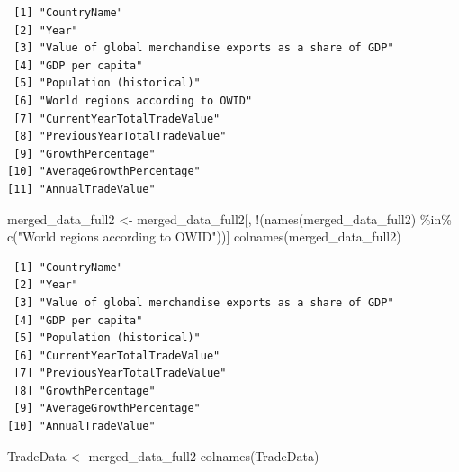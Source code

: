 \documentclass[
  10pt,
]{article}
\newenvironment{Shaded}{\begin{snugshade}}{\end{snugshade}}
\newcommand{\FunctionTok}[1]{\textcolor[rgb]{0.28,0.35,0.67}{#1}}
\newcommand{\NormalTok}[1]{\textcolor[rgb]{0.00,0.23,0.31}{#1}}
\newcommand{\OtherTok}[1]{\textcolor[rgb]{0.00,0.23,0.31}{#1}}
\newcommand{\SpecialCharTok}[1]{\textcolor[rgb]{0.37,0.37,0.37}{#1}}
\newcommand{\StringTok}[1]{\textcolor[rgb]{0.13,0.47,0.30}{#1}}
\begin{document}
\begin{verbatim}
 [1] "CountryName"                                          
 [2] "Year"                                                 
 [3] "Value of global merchandise exports as a share of GDP"
 [4] "GDP per capita"                                       
 [5] "Population (historical)"                              
 [6] "World regions according to OWID"                      
 [7] "CurrentYearTotalTradeValue"                           
 [8] "PreviousYearTotalTradeValue"                          
 [9] "GrowthPercentage"                                     
[10] "AverageGrowthPercentage"                              
[11] "AnnualTradeValue"                                     
\end{verbatim}

\begin{Shaded}
\begin{Highlighting}[]
\NormalTok{merged\_data\_full2 }\OtherTok{\textless{}{-}}\NormalTok{ merged\_data\_full2[, }\SpecialCharTok{!}\NormalTok{(}\FunctionTok{names}\NormalTok{(merged\_data\_full2) }\SpecialCharTok{\%in\%} \FunctionTok{c}\NormalTok{(}\StringTok{"World regions according to OWID"}\NormalTok{))]}
\FunctionTok{colnames}\NormalTok{(merged\_data\_full2)}
\end{Highlighting}
\end{Shaded}

\begin{verbatim}
 [1] "CountryName"                                          
 [2] "Year"                                                 
 [3] "Value of global merchandise exports as a share of GDP"
 [4] "GDP per capita"                                       
 [5] "Population (historical)"                              
 [6] "CurrentYearTotalTradeValue"                           
 [7] "PreviousYearTotalTradeValue"                          
 [8] "GrowthPercentage"                                     
 [9] "AverageGrowthPercentage"                              
[10] "AnnualTradeValue"                                     
\end{verbatim}

\begin{Shaded}
\begin{Highlighting}[]
\NormalTok{TradeData }\OtherTok{\textless{}{-}}\NormalTok{ merged\_data\_full2}
\FunctionTok{colnames}\NormalTok{(TradeData)}
\end{Highlighting}
\end{Shaded}
\end{document}
